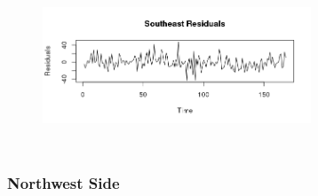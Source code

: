 \documentclass{article} %
\begin{document}
\begin{center}
\begin{figure}[H]
\includegraphics[height=50mm, width=80mm]{Plots/southeast_resid.png}
\end{figure}
\end{center}

 
 
\subsubsection{Northwest Side}
 
\end{document}
